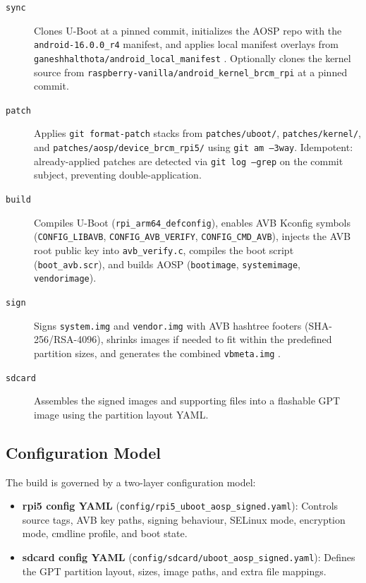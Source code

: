 \begin{description}
    \item[\texttt{sync}] Clones U-Boot at a pinned commit, initializes the AOSP repo with the \texttt{android-16.0.0\_r4} manifest, and applies local manifest overlays from \texttt{ganeshhalthota/android\_local\_manifest} \cite{android_local_manifest}. Optionally clones the kernel source from \texttt{raspberry-vanilla/android\_kernel\_brcm\_rpi} at a pinned commit.

    \item[\texttt{patch}] Applies \texttt{git format-patch} stacks from \texttt{patches/uboot/}, \texttt{patches/kernel/}, and \texttt{patches/aosp/device\_brcm\_rpi5/} using \texttt{git am --3way}. Idempotent: already-applied patches are detected via \texttt{git log --grep} on the commit subject, preventing double-application.

    \item[\texttt{build}] Compiles U-Boot (\texttt{rpi\_arm64\_defconfig}), enables AVB Kconfig symbols (\texttt{CONFIG\_LIBAVB}, \texttt{CONFIG\_AVB\_VERIFY}, \texttt{CONFIG\_CMD\_AVB}), injects the AVB root public key into \texttt{avb\_verify.c}, compiles the boot script (\texttt{boot\_avb.scr}), and builds AOSP (\texttt{bootimage}, \texttt{systemimage}, \texttt{vendorimage}).

    \item[\texttt{sign}] Signs \texttt{system.img} and \texttt{vendor.img} with AVB hashtree footers (SHA-256/RSA-4096), shrinks images if needed to fit within the predefined partition sizes, and generates the combined \texttt{vbmeta.img} \cite{avb2_readme}.

    \item[\texttt{sdcard}] Assembles the signed images and supporting files into a flashable GPT image using the partition layout YAML.
\end{description}

\subsection{Configuration Model}

The build is governed by a two-layer configuration model:

\begin{itemize}
    \item \textbf{rpi5 config YAML} (\texttt{config/rpi5\_uboot\_aosp\_signed.yaml}): Controls source tags, AVB key paths, signing behaviour, SELinux mode, encryption mode, cmdline profile, and boot state.
    \item \textbf{sdcard config YAML} (\texttt{config/sdcard/uboot\_aosp\_signed.yaml}): Defines the GPT partition layout, sizes, image paths, and extra file mappings.
\end{itemize}

